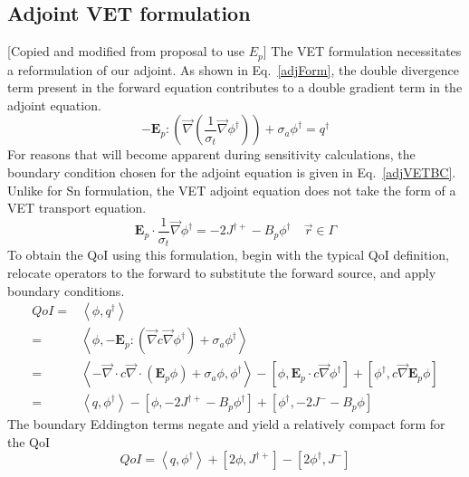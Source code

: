 \documentclass{article}
\newcommand{\vr}{\vec{r}}
\newcommand{\bra}{\left\langle}
\newcommand{\ket}{\right\rangle}
\newcommand{\sbra}{\left[}
\newcommand{\sket}{\right]}
\newcommand{\vdiv}{\vec{\nabla} \cdot}
\newcommand{\vgrad}{\vec{\nabla}}
\newcommand{\Edd}{\mathbf{E}}
\newcommand{\sigt}{\sigma_t}
\newcommand{\siga}{\sigma_a}
\newcommand{\isigt}{c}
\newcommand{\scalSource}{q}
\newcommand{\scalResp}{q^\dag}
\begin{document}
\subsection{Adjoint VET formulation}
[Copied and modified from proposal to use $E_p$]
The VET formulation necessitates a reformulation of our adjoint. As shown in Eq.~\eqref{adjForm}, the double divergence term present in the forward equation contributes to a double gradient term in the adjoint equation.
\begin{equation}
\label{adjForm}
- \Edd_p : \left( \vgrad \left( \frac{1}{\sigt}\vgrad \phi^\dag \right) \right) + \siga \phi^\dag = \scalResp
\end{equation}
For reasons that will become apparent during sensitivity calculations, the boundary condition chosen for the adjoint equation is given in Eq.~\eqref{adjVETBC}. Unlike for Sn formulation, the VET adjoint equation does not take the form of a VET transport equation.
\begin{equation}
\label{adjVETBC}
\Edd_p \cdot \frac{1}{\sigma_{t} } \vec{\nabla} \phi^\dag  = - 2J^{\dag +} - B_p \phi^\dag \quad \vr \in \Gamma
\end{equation}
To obtain the QoI using this formulation, begin with the typical QoI definition, relocate operators to the forward to substitute the forward source, and apply boundary conditions.
\begin{equation}
\label{VETQoIAdjUnpDeriv}
\begin{split}
QoI=&\bra \phi , \scalResp \ket \\
=&\bra \phi , - \Edd_p : \left( \vgrad \isigt \vgrad \phi^\dag \right) + \siga \phi^\dag \ket \\
=& \bra - \vdiv \isigt \vdiv \left( \Edd_p \phi \right) + \siga \phi, \phi^\dag \ket 
- \sbra \phi, \Edd_p \cdot \isigt \vgrad \phi^\dag \sket  
+ \sbra \phi^\dag, \isigt \vgrad \Edd_p \phi \sket \\
=&\bra \scalSource , \phi^\dag \ket 
- \sbra \phi , - 2J^{\dag +} - B_p \phi^\dag \sket + \sbra \phi^\dag, - 2J^- - B_p \phi  \sket
\end{split}
\end{equation}
The boundary Eddington terms negate and yield a relatively compact form for the QoI
\begin{equation}
\label{VETQoIAdj}
QoI=\bra \scalSource , \phi^\dag \ket 
+ \sbra 2\phi, J^{\dag +} \sket  - \sbra 2\phi^\dag, J^- \sket
\end{equation}
\end{document}
